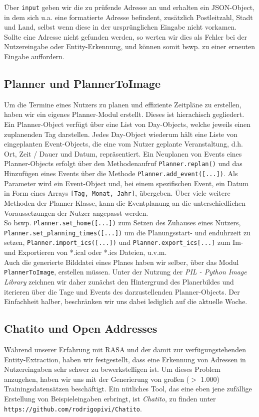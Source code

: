 Über \texttt{input} geben wir die zu prüfende Adresse an und erhalten ein JSON-Object, in dem sich u.a. eine formatierte Adresse befindent, zusätzlich Postleitzahl, Stadt und Land, selbst wenn diese in der ursprünglichen Eingabe nicht vorkamen.\\
Sollte eine Adresse nicht gefunden werden, so werten wir dies als Fehler bei der Nutzereingabe oder Entity-Erkennung, und können somit bswp. zu einer erneuten Eingabe auffordern.

\subsection{Planner und PlannerToImage}
Um die Termine eines Nutzers zu planen und effiziente Zeitpläne zu erstellen, haben wir ein eigenes Planner-Modul erstellt. Dieses ist hierachisch gegliedert. Ein Planner-Object verfügt über eine List von Day-Objects, welche jeweils einen zuplanenden Tag darstellen. Jedes Day-Object wiederum hält eine Liste von eingeplanten Event-Objects, die eine vom Nutzer geplante Veranstaltung, d.h. Ort, Zeit / Dauer und Datum, repräsentiert. Ein Neuplanen von Events eines Planner-Objects erfolgt über den Methodenaufruf \texttt{Planner.replan()} und das Hinzufügen eines Events über die Methode \texttt{Planner.add\_event([...])}. Als Parameter wird ein Event-Object und, bei einem spezifischen Event, ein Datum in Form eines Arrays \texttt{[Tag, Monat, Jahr]}, übergeben. Über viele weitere Methoden der Planner-Klasse, kann die Eventplanung an die unterschiedlichen Voraussetzungen der Nutzer angepasst werden.\\
So bswp. \texttt{Planner.set\_home([...])} zum Setzen des Zuhauses eines Nutzers,\\\texttt{Planner.set\_planning\_times([...])} um die Planungsstart- und enduhrzeit zu setzen, \texttt{Planner.import\_ics([...])} und \texttt{Planner.export\_ics{[...]}} zum Im- und Exportieren von *.ical oder *.ics Dateien, u.v.m.\\

Auch die generierte Bilddatei eines Planes haben wir selber, über das Modul\\ \texttt{PlannerToImage}, erstellen müssen. Unter der Nutzung der \textit{PIL - Python Image Library} zeichnen wir daher zunächst den Hintergrund des Planerbildes und iterieren über die Tage und Events des darzustellenden Planner-Objects. Der Einfachheit halber, beschränken wir uns dabei lediglich auf die aktuelle Woche.


\subsection{Chatito und Open Addresses}
Während unserer Erfahrung mit RASA und der damit zur verfügungstehenden Entity-Extraction, haben wir festgestellt, dass eine Erkennung von Adressen in Nutzereingaben sehr schwer zu bewerkstelligen ist. Um dieses Problem anzugehen, haben wir uns mit der Generierung von großen ($>$ 1.000) Trainingsdatensätzen beschäftigt. Ein nütliches Tool, das eine eben jene zufällige Erstellung von Beispieleingaben erbringt, ist \textit{Chatito}, zu finden unter \texttt{https://github.com/rodrigopivi/Chatito}.\\


